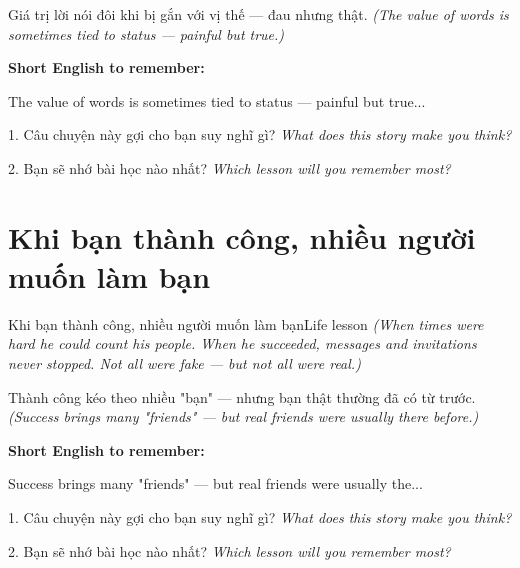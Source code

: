 \begin{baihoc}
Giá trị lời nói đôi khi bị gắn với vị thế — đau nhưng thật.
\textit{(The value of words is sometimes tied to status — painful but true.)}
\end{baihoc}

\begin{ghinhoanh}
\textbf{Short English to remember:}

The value of words is sometimes tied to status — painful but true...

\end{ghinhoanh}

\begin{tuhocnhanh}
1. Câu chuyện này gợi cho bạn suy nghĩ gì? \textit{What does this story make you think?}

2. Bạn sẽ nhớ bài học nào nhất? \textit{Which lesson will you remember most?}
\end{tuhocnhanh}
\ngancach


\section{Khi bạn thành công, nhiều người muốn làm bạn}
\begin{truyen}{Khi bạn thành công, nhiều người muốn làm bạn}{Life lesson}
\textit{(When times were hard he could count his people. When he succeeded, messages and invitations never stopped. Not all were fake — but not all were real.)}
\end{truyen}

\begin{baihoc}
Thành công kéo theo nhiều "bạn" — nhưng bạn thật thường đã có từ trước.
\textit{(Success brings many "friends" — but real friends were usually there before.)}
\end{baihoc}

\begin{ghinhoanh}
\textbf{Short English to remember:}

Success brings many "friends" — but real friends were usually the...

\end{ghinhoanh}

\begin{tuhocnhanh}
1. Câu chuyện này gợi cho bạn suy nghĩ gì? \textit{What does this story make you think?}

2. Bạn sẽ nhớ bài học nào nhất? \textit{Which lesson will you remember most?}
\end{tuhocnhanh}
\ngancach


